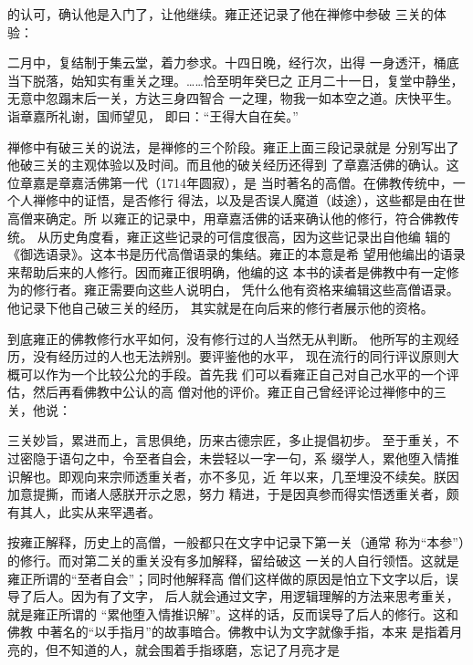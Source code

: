 的认可，确认他是入门了，让他继续。雍正还记录了他在禅修中参破%
三关的体验：%
\par
{\bookkai 二月中，复结制于集云堂，着力参求。十四日晚，经行次，出得}%
{\bookkai 一身透汗，桶底当下脱落，始知实有重关之理。……恰至明年癸巳之}%
{\bookkai 正月二十一日，复堂中静坐，无意中忽蹋末后一关，方达三身四智合}%
{\bookkai 一之理，物我一如本空之道。庆快平生。诣章嘉所礼谢，国师望见，}%
{\bookkai 即曰：“王得大自在矣。”}%
\par
禅修中有破三关的说法，是禅修的三个阶段。雍正上面三段记录就是%
分别写出了他破三关的主观体验以及时间。而且他的破关经历还得到%
了章嘉活佛的确认。这位章嘉是章嘉活佛第一代（1714年圆寂），是%
当时著名的高僧。在佛教传统中，一个人禅修中的证悟，是否修行%
得法，以及是否误人魔道（歧途），这些都是由在世高僧来确定。所%
以雍正的记录中，用章嘉活佛的话来确认他的修行，符合佛教传统。%
从历史角度看，雍正这些记录的可信度很高，因为这些记录出自他编%
辑的《御选语录》。这本书是历代高僧语录的集结。雍正的本意是希%
望用他编出的语录来帮助后来的人修行。因而雍正很明确，他编的这%
本书的读者是佛教中有一定修为的修行者。雍正需要向这些人说明白，%
凭什么他有资格来编辑这些高僧语录。他记录下他自己破三关的经历，%
其实就是在向后来的修行者展示他的资格。%
\par
到底雍正的佛教修行水平如何，没有修行过的人当然无从判断。%
他所写的主观经历，没有经历过的人也无法辨别。要评鉴他的水平，%
现在流行的同行评议原则大概可以作为一个比较公允的手段。首先我%
们可以看雍正自己对自己水平的一个评估，然后再看佛教中公认的高%
僧对他的评价。雍正自己曾经评论过禅修中的三关，他说：%
\par
{\bookkai 三关妙旨，累进而上，言思俱绝，历来古德宗匠，多止提倡初步。}%
{\bookkai 至于重关，不过密隐于语句之中，令至者自会，未尝轻以一字一句，系}%
{\bookkai 缀学人，累他堕入情推识解也。即观向来宗师透重关者，亦不多见，近}%
{\bookkai 年以来，几至埋没不续矣。朕因加意提撕，而诸人感朕开示之恩，努力}%
{\bookkai 精进，于是因真参而得实悟透重关者，颇有其人，此实从来罕遇者。}%
\par
按雍正解释，历史上的高僧，一般都只在文字中记录下第一关（通常%
称为“本参”）的修行。而对第二关的重关没有多加解释，留给破这%
一关的人自行领悟。这就是雍正所谓的“至者自会”；同时他解释高%
僧们这样做的原因是怕立下文字以后，误导了后人。因为有了文字，%
后人就会通过文字，用逻辑理解的方法来思考重关，就是雍正所谓的%
“累他堕入情推识解”。这样的话，反而误导了后人的修行。这和佛教%
中著名的“以手指月”的故事暗合。佛教中认为文字就像手指，本来%
是指着月亮的，但不知道的人，就会围着手指琢磨，忘记了月亮才是%
